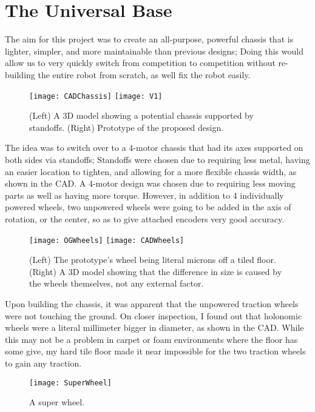 \section{The Universal Base}
The aim for this project was to create an all-purpose, powerful chassis that is lighter, simpler, and more maintainable than previous designs; Doing this would allow us to very quickly switch from competition to competition without re-building the entire robot from scratch, as well fix the robot easily.

\begin{figure}[h]
    \centering
    \texttt{[image: CADChassis]}
    \texttt{[image: V1]}
    \caption{
        (Left) A 3D model showing a potential chassis supported by standoffs. (Right) Prototype of the proposed design.
    }
\end{figure}

The idea was to switch over to a 4-motor chassis that had its axes supported on both sides via standoffs; Standoffs were chosen due to requiring less metal, having an easier location to tighten, and allowing for a more flexible chassis width, as shown in the CAD. A 4-motor design was chosen due to requiring less moving parts as well as having more torque. However, in addition to 4 individually powered wheels, two unpowered wheels were going to be added in the axis of rotation, or the center, so as to give attached encoders very good accuracy.

\begin{figure}[h]
    \centering
    \texttt{[image: OGWheels]}
    \texttt{[image: CADWheels]}
    \caption{
        (Left) The prototype's wheel being literal microns off a tiled floor. (Right) A 3D model showing that the difference in size is caused by the wheels themselves, not any external factor.
    }
\end{figure}

Upon building the chassis, it was apparent that the unpowered traction wheels were not touching the ground. On closer inspection, I found out that holonomic wheels were a literal millimeter bigger in diameter, as shown in the CAD. While this may not be a problem in carpet or foam environments where the floor has some give, my hard tile floor made it near impossible for the two traction wheels to gain any traction.

\begin{figure}[h]
    \centering
    \texttt{[image: SuperWheel]}
    \caption{
        A super wheel.
    }
\end{figure}


